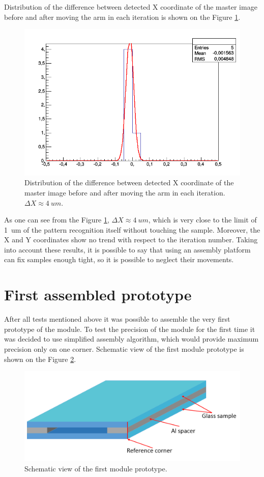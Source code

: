 Distribution of the difference between detected X coordinate of the master image before and after moving the arm in each iteration is shown on the Figure \ref{fig:platform_distribution}.

\begin{figure}[ht]\centering
\includegraphics[width=0.8\linewidth]{Data/Precision_tests/Platform_x_distrib.png}
\caption{Distribution of the difference between detected X coordinate of the master image before and after moving the arm in each iteration. $\Delta X \approx 4~um$. }
\label{fig:platform_distribution}
\end{figure}

As one can see from the Figure \ref{fig:platform_distribution}, $\Delta X \approx 4~um$, which is very close to the limit of 1~um of the pattern recognition itself without touching the sample. Moreover, the X and Y coordinates show no trend with respect to the iteration number. Taking into account these results, it is possible to say that using an assembly platform can fix samples enough tight, so it is possible to neglect their movements.

\section{First assembled prototype}

After all tests mentioned above it was possible to assemble the very first prototype of the module. To test the precision of the module for the first time it was decided to use simplified assembly algorithm, which would provide maximum precision only on one corner. Schematic view of the first module prototype is shown on the Figure \ref{fig:module_prototype}.

\begin{figure}[ht]\centering
\includegraphics[width=0.8\linewidth]{Data/Precision_tests/Module_prototype.png}
\caption{Schematic view of the first module prototype.}
\label{fig:module_prototype}
\end{figure}

